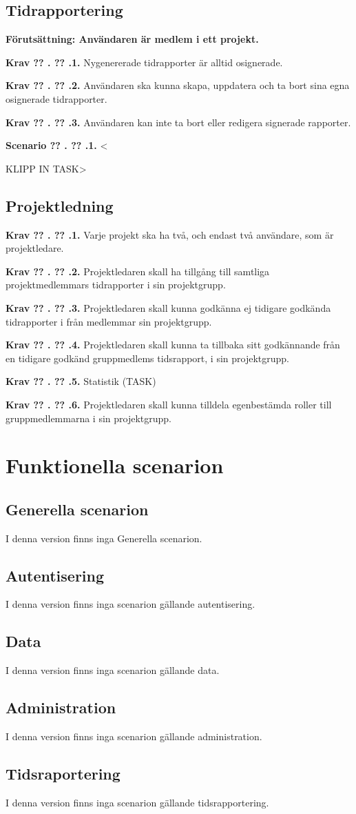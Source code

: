 \documentclass[a4paper]{article}
\newcommand\getcurrentref[1]{%
 \ifnumequal{\value{#1}}{0}
  {??}
  {\the\value{#1}}%
}
\newcommand\requirement[2]{
	\numberedrow{Krav}{#1}{#2}
}
\newcommand\scenario[2] {
	\numberedrow{Scenario}{#1}{#2}
}
\newcommand\numberedrow[3]{
	\noindent
	\textbf{#1 \getcurrentref{section}.\getcurrentref{subsection}.#2.} #3
	
}
\begin{document}
\subsection{Tidrapportering}
\textbf{Förutsättning: Användaren är medlem i ett projekt.}\newline
\requirement{1}{Nygenererade tidrapporter är alltid osignerade.}
\requirement{2}{Användaren ska kunna skapa, uppdatera och ta bort sina egna osignerade tidrapporter.}
\requirement{3}{Användaren kan inte ta bort eller redigera signerade rapporter.}
\scenario{1} <KLIPP IN TASK>
\subsection{Projektledning}
\requirement{1}{Varje projekt ska ha två, och endast två användare, som är projektledare.}
\requirement{2}{Projektledaren skall ha tillgång till samtliga projektmedlemmars tidrapporter i sin projektgrupp.}
\requirement{3}{Projektledaren skall kunna godkänna ej tidigare godkända tidrapporter i från medlemmar sin projektgrupp.}
\requirement{4}{Projektledaren skall kunna ta tillbaka sitt godkännande från en tidigare godkänd gruppmedlems tidsrapport, i sin projektgrupp.}
\requirement{5}{Statistik (TASK)}
\requirement{6}{Projektledaren skall kunna tilldela egenbestämda roller till gruppmedlemmarna i sin projektgrupp.}
\section{Funktionella scenarion}
\label{scenarion}
\subsection{Generella scenarion}
I denna version finns inga Generella scenarion.
\subsection{Autentisering}
I denna version finns inga scenarion gällande autentisering.
\subsection{Data}
I denna version finns inga scenarion gällande data.
\subsection{Administration}
I denna version finns inga scenarion gällande administration.
\subsection{Tidsraportering}
I denna version finns inga scenarion gällande tidsrapportering.
\end{document}
